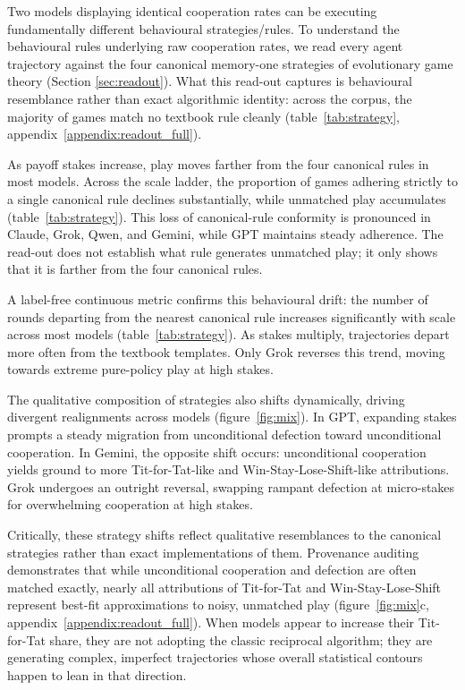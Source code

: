 \documentclass[11pt,a4paper]{article}
\newcommand{\rev}[1]{{\color{red}#1}}
\newcommand{\rev}[1]{#1}
\begin{document}
Two models displaying identical cooperation rates can be executing fundamentally
different behavioural strategies/rules. To understand the behavioural rules underlying raw
cooperation rates, we read every agent trajectory against the four canonical
memory-one strategies of evolutionary game theory (Section \ref{sec:readout}). What
this read-out captures is behavioural resemblance rather than exact algorithmic
identity: across the corpus, the majority of games match no textbook rule
cleanly (table~\ref{tab:strategy}, appendix~\ref{appendix:readout_full}).

As payoff stakes \rev{increase}, play moves farther from the four canonical rules in
most models. Across the scale ladder, the proportion of games adhering
strictly to a single canonical rule declines substantially, while unmatched
play accumulates (table~\ref{tab:strategy}). This loss of canonical-rule
conformity is pronounced in Claude, Grok, Qwen, and Gemini, while GPT maintains
steady adherence. The read-out does not establish what rule generates unmatched
play; it only shows that it is farther from the four canonical rules.

A label-free continuous metric confirms this behavioural drift: the number of
rounds departing from the nearest canonical rule increases significantly with
scale across most models (table~\ref{tab:strategy}). As stakes multiply,
trajectories depart more often from the textbook templates. Only Grok reverses
this trend, moving towards extreme pure-policy play at high stakes.

The qualitative composition of strategies also shifts dynamically, driving
divergent realignments across models (figure~\ref{fig:mix}). In GPT, expanding
stakes prompts a steady migration from unconditional defection toward
unconditional cooperation. In Gemini, the opposite shift occurs: unconditional
cooperation yields ground to more Tit-for-Tat-like and Win-Stay-Lose-Shift-like
attributions. Grok undergoes an outright
reversal, swapping rampant defection at micro-stakes for overwhelming cooperation
at high stakes.

Critically, these strategy shifts reflect qualitative resemblances \rev{to the
canonical strategies} rather than exact implementations of them. Provenance auditing demonstrates that while unconditional
cooperation and defection are often matched exactly, nearly all attributions of
Tit-for-Tat and Win-Stay-Lose-Shift represent best-fit approximations to noisy,
unmatched play (figure~\ref{fig:mix}c, appendix~\ref{appendix:readout_full}).
When models appear to increase their Tit-for-Tat share, they are not adopting the
classic reciprocal algorithm; they are generating complex, imperfect trajectories
whose overall statistical contours happen to lean in that direction.
\end{document}
